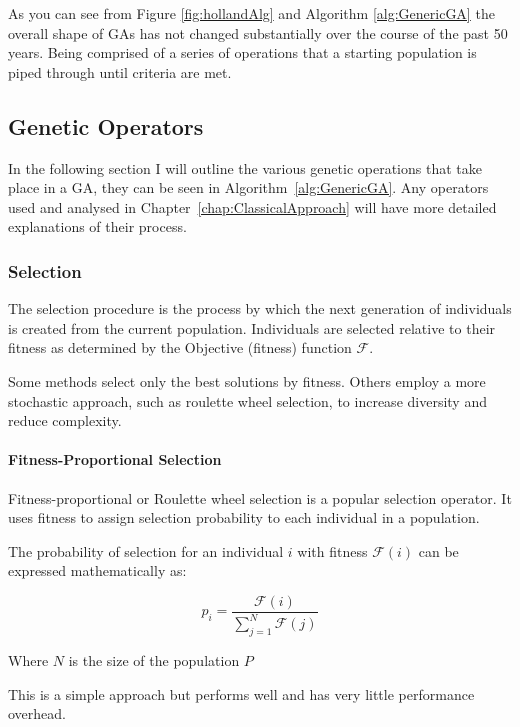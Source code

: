 As you can see from Figure \ref{fig:hollandAlg} and Algorithm \ref{alg:GenericGA} the overall shape of GAs has not changed substantially over the course of the past 50 years. Being comprised of a series of operations that a starting population is piped through until criteria are met.

\subsection{Genetic Operators}
\label{subsec:GAOps}
In the following section I will outline the various genetic operations that take place in a GA, they can be seen in Algorithm~\ref{alg:GenericGA}. Any operators used and analysed in Chapter~\ref{chap:ClassicalApproach} will have more detailed explanations of their process.

\subsubsection{Selection}

The selection procedure is the process by which the next generation of individuals is created from the current population. Individuals are selected relative to their fitness as determined by the Objective (fitness) function $\mathcal{F}$. 

Some methods select only the best solutions by fitness. Others employ a more stochastic approach, such as roulette wheel selection, to increase diversity and reduce complexity.

\paragraph{Fitness-Proportional Selection}\label{imp:FitPropSel}

Fitness-proportional or Roulette wheel selection is a popular selection operator. It uses fitness to assign selection probability to each individual in a population.

The probability of selection for an individual $i$ with fitness $\mathcal{F}(i)$ can be expressed mathematically as:

\begin{equation}
    p_i = \frac{\mathcal{F}(i)}{ \sum^{N}_{j=1} \mathcal{F}(j)} 
\end{equation}

Where $N$ is the size of the population $P$

This is a simple approach but performs well and has very little performance overhead.


